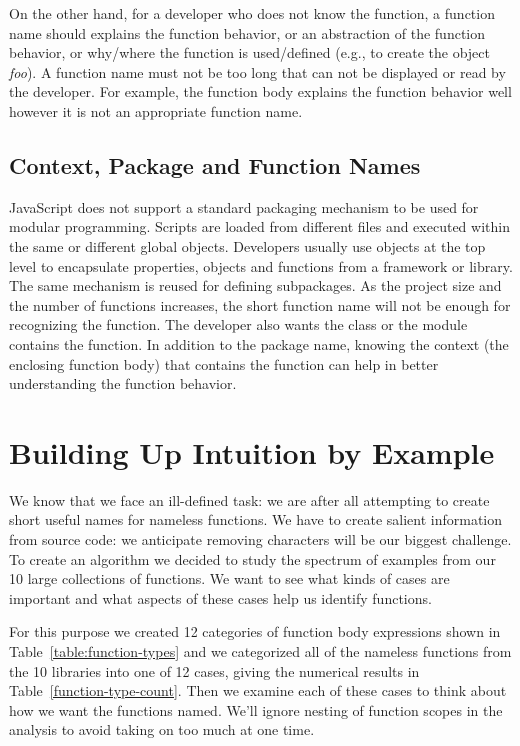 \documentclass[10pt, preprint]{sigplanconf}
\begin{document}
 On the other hand, for a developer who does not know the function, a function name should explains the function behavior, or an abstraction of the function behavior, or why/where the function is used/defined (e.g., to create the object \textit{foo}). A function name must not be too long that can not be displayed or read by the developer. For example, the function body explains the function behavior well however it is not an appropriate function name.

\subsection{Context, Package and Function Names}
JavaScript does not support a standard packaging mechanism to be used for modular programming. Scripts are loaded from different files and executed within the same or different global objects. Developers usually use objects at the top level to encapsulate properties, objects and functions from a framework or library. The same mechanism is reused for defining subpackages. As the project size and the number of functions increases, the short function name will not be enough for recognizing the function. The developer also wants the class or the module contains the function. In addition to the package name, knowing the context (the enclosing function body) that contains the function can help in better understanding the function behavior.


\section{Building Up Intuition by Example}
We know that we face an ill-defined task: we are after all attempting to create short useful names for nameless functions. We have to create salient information from source code: we anticipate removing characters will be our biggest challenge.  To create an algorithm we decided to study the spectrum of examples from our 10 large collections of functions. We want to see what kinds of cases are important and what aspects of these cases help us identify functions.

For this purpose we created 12 categories of function body expressions shown in Table~\ref{table:function-types} and we categorized all of the nameless functions from the 10 libraries into one of 12 cases, giving the numerical results in Table~\ref{function-type-count}.  Then we examine each of these cases to think about how we want the functions named. We'll ignore nesting of function scopes in the analysis to avoid taking on too much at one time.
  
\end{document}
